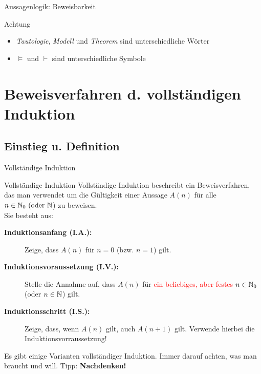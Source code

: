 \begin{frame}{Aussagenlogik: Beweisbarkeit}    
	\begin{alertblock}{Achtung}
		\begin{itemize}
			\item \emph{Tautologie}, \emph{Modell} und \emph{Theorem} sind unterschiedliche Wörter
			\item $\models$ und $\vdash$ sind unterschiedliche Symbole
		\end{itemize}
	\end{alertblock}
\end{frame}

\section[Vollständige Induktion]{Beweisverfahren d. vollständigen Induktion}
\subsection{Einstieg u. Definition}
\begin{frame}{Vollständige Induktion}
	\begin{block}{Vollständige Induktion}
		Vollständige Induktion beschreibt ein Beweisverfahren, das man verwendet um die Gültigkeit einer Aussage \(A(n)\) für alle \(n \in \mathbb{N}_{0} \text{ (oder } \mathbb{N}\)) zu beweisen.\\
		
		Sie besteht aus:
		\begin{description}
			\item [\textbf{Induktionsanfang (I.A.):}] Zeige, dass \(A(n)\) für \(n=0\) (bzw. \(n=1\)) gilt.
			\item [\textbf{Induktionsvoraussetzung (I.V.):}] Stelle die Annahme auf, dass \(A(n)\) für \textcolor{red}{ein beliebiges, aber festes} \(n \in \mathbb{N}_{0}\) (oder \(n \in \mathbb{N}\)) gilt.
			\item [\textbf{Induktionsschritt (I.S.):}] Zeige, dass, wenn \(A(n)\) gilt, auch \(A(n+1)\) gilt. Verwende hierbei die Induktionsvorraussetzung!
		\end{description}
	\end{block}

	\begin{alertblock}{}
		Es gibt einige Varianten vollständiger Induktion. Immer darauf achten, was man braucht und will. Tipp: \textbf{Nachdenken!}
	\end{alertblock}
\end{frame}
